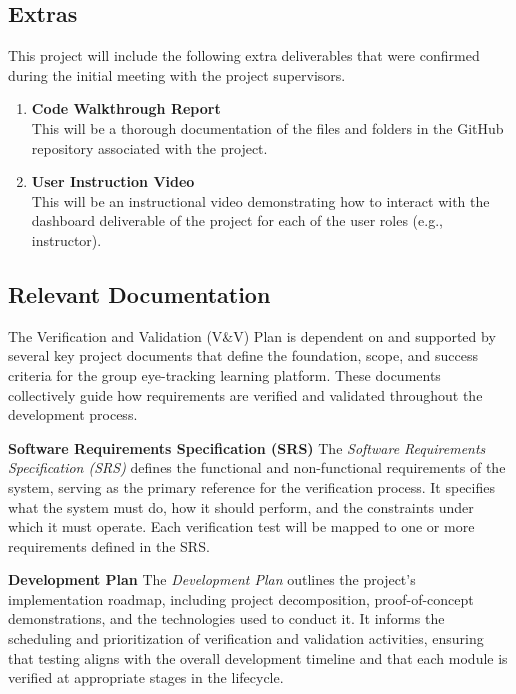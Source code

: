 \documentclass[12pt, titlepage]{article}
\begin{document}
\subsection{Extras}
This project will include the following extra deliverables that were confirmed during the initial meeting with the project supervisors.

\begin{enumerate}
    \item \textbf{Code Walkthrough Report} \\
    This will be a thorough documentation of the files and folders in the GitHub repository associated with the project.
    
    \item \textbf{User Instruction Video} \\
    This will be an instructional video demonstrating how to interact with the dashboard deliverable of the project for each of the user roles (e.g., instructor).
\end{enumerate}


\subsection{Relevant Documentation}
The Verification and Validation (V\&V) Plan is dependent on and supported by several key project documents that define the foundation, scope, and success criteria for the group eye-tracking learning platform. These documents collectively guide how requirements are verified and validated throughout the development process.
\newline

\textbf{Software Requirements Specification (SRS)}
\newline
\newline
The \textit{Software Requirements Specification (SRS)} defines the functional and non-functional requirements of the system, serving as the primary reference for the verification process. It specifies what the system must do, how it should perform, and the constraints under which it must operate. Each verification test will be mapped to one or more requirements defined in the SRS.
\newline

\textbf{Development Plan}
\newline
\newline
The \textit{Development Plan} outlines the project’s implementation roadmap, including project decomposition, proof-of-concept demonstrations, and the technologies used to conduct it. It informs the scheduling and prioritization of verification and validation activities, ensuring that testing aligns with the overall development timeline and that each module is verified at appropriate stages in the lifecycle.
\newline
\end{document}
